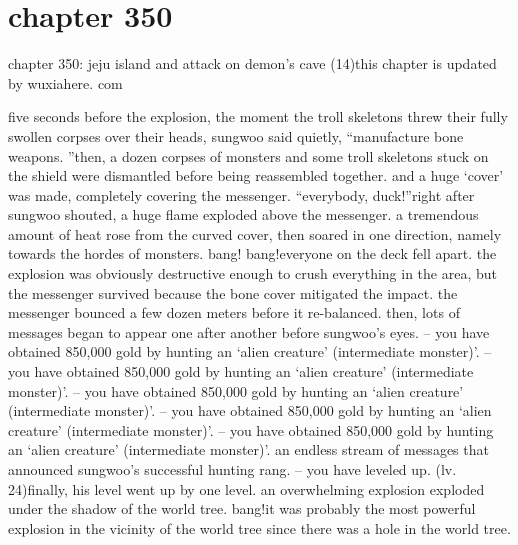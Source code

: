 \section{chapter 350}

chapter 350: jeju island and attack on demon’s cave (14)this chapter is updated by wuxiahere.
com




five seconds before the explosion, the moment the troll skeletons threw their fully swollen corpses over their heads, sungwoo said quietly, “manufacture bone weapons.
”then, a dozen corpses of monsters and some troll skeletons stuck on the shield were dismantled before being reassembled together.
 and a huge ‘cover’ was made, completely covering the messenger.
“everybody, duck!”right after sungwoo shouted, a huge flame exploded above the messenger.
a tremendous amount of heat rose from the curved cover, then soared in one direction, namely towards the hordes of monsters.
bang! bang!everyone on the deck fell apart.
 the explosion was obviously destructive enough to crush everything in the area, but the messenger survived because the bone cover mitigated the impact.
 the messenger bounced a few dozen meters before it re-balanced.
then, lots of messages began to appear one after another before sungwoo’s eyes.
– you have obtained 850,000 gold by hunting an ‘alien creature’ (intermediate monster)’.
– you have obtained 850,000 gold by hunting an ‘alien creature’ (intermediate monster)’.
– you have obtained 850,000 gold by hunting an ‘alien creature’ (intermediate monster)’.
– you have obtained 850,000 gold by hunting an ‘alien creature’ (intermediate monster)’.
– you have obtained 850,000 gold by hunting an ‘alien creature’ (intermediate monster)’.
an endless stream of messages that announced sungwoo’s successful hunting rang.
– you have leveled up.
 (lv.
 24)finally, his level went up by one level.
an overwhelming explosion exploded under the shadow of the world tree.
bang!it was probably the most powerful explosion in the vicinity of the world tree since there was a hole in the world tree.

